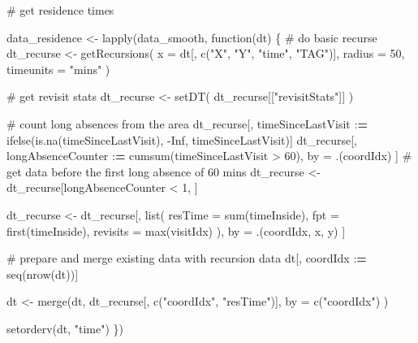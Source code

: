 \documentclass[]{scrreprt}
\newenvironment{Shaded}{}{}
\newcommand{\CommentTok}[1]{\textcolor[rgb]{0.00,0.50,0.00}{#1}}
\newcommand{\ControlFlowTok}[1]{\textcolor[rgb]{0.00,0.00,1.00}{#1}}
\newcommand{\DataTypeTok}[1]{#1}
\newcommand{\DecValTok}[1]{#1}
\newcommand{\ErrorTok}[1]{\textcolor[rgb]{1.00,0.00,0.00}{\textbf{#1}}}
\newcommand{\KeywordTok}[1]{\textcolor[rgb]{0.00,0.00,1.00}{#1}}
\newcommand{\NormalTok}[1]{#1}
\newcommand{\OperatorTok}[1]{#1}
\newcommand{\OtherTok}[1]{\textcolor[rgb]{1.00,0.25,0.00}{#1}}
\newcommand{\StringTok}[1]{\textcolor[rgb]{0.00,0.50,0.50}{#1}}
\begin{document}
\begin{Shaded}
\begin{Highlighting}[]
\CommentTok{# get residence times}

\NormalTok{data_residence <-}\StringTok{ }\KeywordTok{lapply}\NormalTok{(data_smooth, }\ControlFlowTok{function}\NormalTok{(dt) \{}
  \CommentTok{# do basic recurse}
\NormalTok{  dt_recurse <-}\StringTok{ }\KeywordTok{getRecursions}\NormalTok{(}
    \DataTypeTok{x =}\NormalTok{ dt[, }\KeywordTok{c}\NormalTok{(}\StringTok{"X"}\NormalTok{, }\StringTok{"Y"}\NormalTok{, }\StringTok{"time"}\NormalTok{, }\StringTok{"TAG"}\NormalTok{)],}
    \DataTypeTok{radius =} \DecValTok{50}\NormalTok{,}
    \DataTypeTok{timeunits =} \StringTok{"mins"}
\NormalTok{  )}

  \CommentTok{# get revisit stats}
\NormalTok{  dt_recurse <-}\StringTok{ }\KeywordTok{setDT}\NormalTok{(}
\NormalTok{    dt_recurse[[}\StringTok{"revisitStats"}\NormalTok{]]}
\NormalTok{  )}

  \CommentTok{# count long absences from the area}
\NormalTok{  dt_recurse[, timeSinceLastVisit }\OperatorTok{:}\ErrorTok{=}
\StringTok{    }\KeywordTok{ifelse}\NormalTok{(}\KeywordTok{is.na}\NormalTok{(timeSinceLastVisit), }\OperatorTok{-}\OtherTok{Inf}\NormalTok{, timeSinceLastVisit)]}
\NormalTok{  dt_recurse[, longAbsenceCounter }\OperatorTok{:}\ErrorTok{=}\StringTok{ }\KeywordTok{cumsum}\NormalTok{(timeSinceLastVisit }\OperatorTok{>}\StringTok{ }\DecValTok{60}\NormalTok{),}
\NormalTok{    by =}\StringTok{ }\NormalTok{.(coordIdx)}
\NormalTok{  ]}
  \CommentTok{# get data before the first long absence of 60 mins}
\NormalTok{  dt_recurse <-}\StringTok{ }\NormalTok{dt_recurse[longAbsenceCounter }\OperatorTok{<}\StringTok{ }\DecValTok{1}\NormalTok{, ]}

\NormalTok{  dt_recurse <-}\StringTok{ }\NormalTok{dt_recurse[, }\KeywordTok{list}\NormalTok{(}
    \DataTypeTok{resTime =} \KeywordTok{sum}\NormalTok{(timeInside),}
    \DataTypeTok{fpt =} \KeywordTok{first}\NormalTok{(timeInside),}
    \DataTypeTok{revisits =} \KeywordTok{max}\NormalTok{(visitIdx)}
\NormalTok{  ),}
\NormalTok{  by =}\StringTok{ }\NormalTok{.(coordIdx, x, y)}
\NormalTok{  ]}

  \CommentTok{# prepare and merge existing data with recursion data}
\NormalTok{  dt[, coordIdx }\OperatorTok{:}\ErrorTok{=}\StringTok{ }\KeywordTok{seq}\NormalTok{(}\KeywordTok{nrow}\NormalTok{(dt))]}

\NormalTok{  dt <-}\StringTok{ }\KeywordTok{merge}\NormalTok{(dt,}
\NormalTok{    dt_recurse[, }\KeywordTok{c}\NormalTok{(}\StringTok{"coordIdx"}\NormalTok{, }\StringTok{"resTime"}\NormalTok{)],}
    \DataTypeTok{by =} \KeywordTok{c}\NormalTok{(}\StringTok{"coordIdx"}\NormalTok{)}
\NormalTok{  )}

  \KeywordTok{setorderv}\NormalTok{(dt, }\StringTok{"time"}\NormalTok{)}
\NormalTok{\})}
\end{Highlighting}
\end{Shaded}
\end{document}
